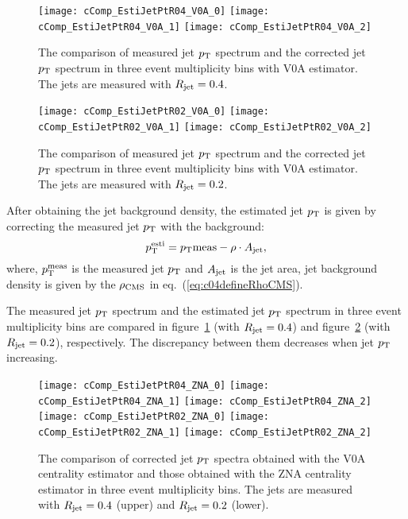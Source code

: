 \begin{figure}[htb]
\begin{center}
\texttt{[image: cComp\_EstiJetPtR04\_V0A\_0]}
\texttt{[image: cComp\_EstiJetPtR04\_V0A\_1]}
\texttt{[image: cComp\_EstiJetPtR04\_V0A\_2]}
\caption{The comparison of measured jet $p_{\rm T}$ spectrum and the corrected
         jet $p_{\rm T}$ spectrum in three event multiplicity bins
         with V0A estimator.
         The jets are measured with $R_{\rm jet}=0.4$.}
\label{fig:c04EstiJetPtR04V0A}
\end{center}
\end{figure}

\begin{figure}[htb]
\begin{center}
\texttt{[image: cComp\_EstiJetPtR02\_V0A\_0]}
\texttt{[image: cComp\_EstiJetPtR02\_V0A\_1]}
\texttt{[image: cComp\_EstiJetPtR02\_V0A\_2]}
\caption{The comparison of measured jet $p_{\rm T}$ spectrum and the corrected
         jet $p_{\rm T}$ spectrum in three event multiplicity bins
         with V0A estimator.
         The jets are measured with $R_{\rm jet}=0.2$.}
\label{fig:c04EstiJetPtR02V0A}
\end{center}
\end{figure}

After obtaining the jet background density,
the estimated jet $p_{\rm T}$ is given by correcting the measured jet $p_{\rm T}$
with the background:
\begin{equation}\label{eq:c04DefEstiJetPT}
p_{\rm T}^{\rm esti}=p_{\rm T}{\rm meas}-\rho\cdot A_{\rm jet},
\end{equation}
where, $p_{\rm T}^{\rm meas}$ is the measured jet $p_{\rm T}$ and $A_{\rm jet}$ is the jet
area, jet background density is given by the $\rho_{\rm CMS}$
in eq.~(\ref{eq:c04defineRhoCMS}).

The measured jet $p_{\rm T}$ spectrum and the estimated jet $p_{\rm T}$ spectrum in three
event multiplicity bins are compared in
figure~\ref{fig:c04EstiJetPtR04V0A} (with $R_{\rm jet}=0.4$)
and figure~\ref{fig:c04EstiJetPtR02V0A} (with $R_{\rm jet}=0.2$),
respectively.
The discrepancy between them decreases when jet $p_{\rm T}$ increasing.

\begin{figure}[htb]
\begin{center}
\texttt{[image: cComp\_EstiJetPtR04\_ZNA\_0]}
\texttt{[image: cComp\_EstiJetPtR04\_ZNA\_1]}
\texttt{[image: cComp\_EstiJetPtR04\_ZNA\_2]}
\texttt{[image: cComp\_EstiJetPtR02\_ZNA\_0]}
\texttt{[image: cComp\_EstiJetPtR02\_ZNA\_1]}
\texttt{[image: cComp\_EstiJetPtR02\_ZNA\_2]}
\caption{The comparison of corrected jet $p_{\rm T}$ spectra obtained with the V0A
         centrality estimator and those obtained with the ZNA centrality
         estimator in three event multiplicity bins.
         The jets are measured with $R_{\rm jet}=0.4$ (upper)
         and $R_{\rm jet}=0.2$ (lower).}
\label{fig:c04EstiJetPtZNA}
\end{center}
\end{figure}

